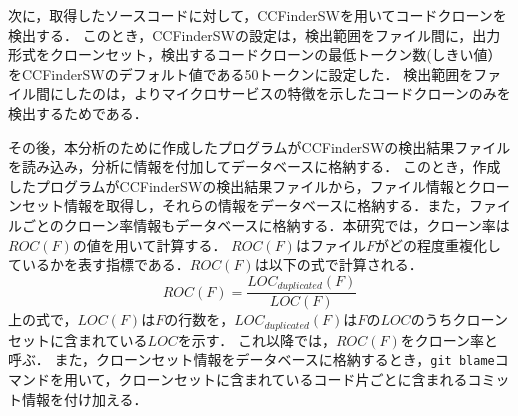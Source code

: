 \documentclass[T,J]{fose}
\begin{document}
次に，取得したソースコードに対して，CCFinderSWを用いてコードクローンを検出する．
このとき，CCFinderSWの設定は，検出範囲をファイル間に，出力形式をクローンセット，検出するコードクローンの最低トークン数(しきい値）をCCFinderSWのデフォルト値である50トークンに設定した．
検出範囲をファイル間にしたのは，よりマイクロサービスの特徴を示したコードクローンのみを検出するためである．


その後，本分析のために作成したプログラムがCCFinderSWの検出結果ファイルを読み込み，分析に情報を付加してデータベースに格納する．
このとき，作成したプログラムがCCFinderSWの検出結果ファイルから，ファイル情報とクローンセット情報を取得し，それらの情報をデータベースに格納する．また，ファイルごとのクローン率情報もデータベースに格納する．本研究では，クローン率は$ROC(F)$の値を用いて計算する．
$ROC(F)$はファイル$F$がどの程度重複化しているかを表す指標である．$ROC(F)$は以下の式で計算される．
\[ROC(F) = \frac{LOC_{duplicated}(F)}{LOC(F)}\]
上の式で，$LOC(F)$は$F$の行数を，$LOC_{duplicated}(F)$は$F$の$LOC$のうちクローンセットに含まれている$LOC$を示す．
これ以降では，$ROC(F)$をクローン率と呼ぶ．
また，クローンセット情報をデータベースに格納するとき，\verb|git blame|コマンドを用いて，クローンセットに含まれているコード片ごとに含まれるコミット情報を付け加える．
\end{document}
